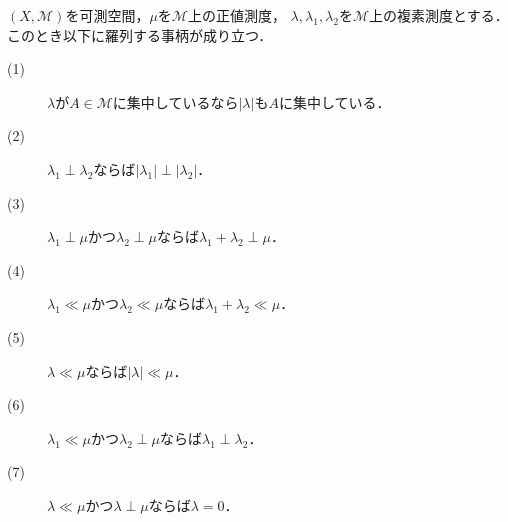 	
	\begin{itembox}[l]{}
		\begin{prp}[絶対連続性と特異性に関する性質]
			$(X,\mathcal{M})$を可測空間，$\mu$を$\mathcal{M}$上の正値測度，
			$\lambda,\lambda_1,\lambda_2$を$\mathcal{M}$上の複素測度とする．このとき以下に羅列する事柄が成り立つ．
			\begin{description}
				\item[(1)] $\lambda$が$A \in \mathcal{M}$に集中しているなら$|\lambda|$も$A$に集中している．
				\item[(2)] $\lambda_1 \perp \lambda_2$ならば$|\lambda_1| \perp |\lambda_2|$．
				\item[(3)] $\lambda_1 \perp \mu$かつ$\lambda_2 \perp \mu$ならば$\lambda_1 + \lambda_2 \perp \mu$．
				\item[(4)] $\lambda_1 \ll \mu$かつ$\lambda_2 \ll \mu$ならば$\lambda_1 + \lambda_2 \ll \mu$．
				\item[(5)] $\lambda \ll \mu$ならば$|\lambda| \ll \mu$．
				\item[(6)] $\lambda_1 \ll \mu$かつ$\lambda_2 \perp \mu$ならば$\lambda_1 \perp \lambda_2$．
				\item[(7)] $\lambda \ll \mu$かつ$\lambda \perp \mu$ならば$\lambda = 0$．
			\end{description}
			\label{prp:absolute_continuous_singular}
		\end{prp}
	\end{itembox}